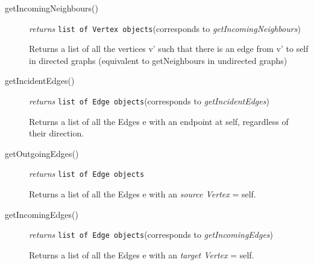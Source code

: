 \documentclass{article}
\newlength\q
\begin{document}
\begin{description}
\label{getIncomingNeighboursClass}\item[getIncomingNeighbours()]\emph{returns} \texttt{list of Vertex objects}\quad(corresponds to \textit{getIncomingNeighbours})

Returns a list of all the vertices v' such that there is an edge from v' to self in directed graphs (equivalent to getNeighbours in undirected graphs)

\label{getIncidentEdgesClass}\item[getIncidentEdges()]\emph{returns} \texttt{list of Edge objects}\quad(corresponds to \textit{getIncidentEdges})


Returns a list of all the Edges e with an endpoint at self, regardless of their direction.

\item[getOutgoingEdges()]\emph{returns}
  \texttt{list of Edge objects}

Returns a list of all the Edges e with an \textit{source Vertex} = self.

\label{getIncomingEdgesClass}\item[getIncomingEdges()]\emph{returns} \texttt{list of Edge objects}\quad(corresponds to \textit{getIncomingEdges})

Returns a list of all the Edges e with an \textit{target Vertex} = self.

\end{description}
\end{document}
